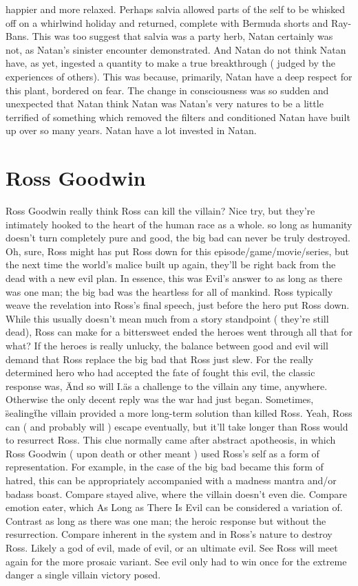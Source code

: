 \documentclass[12pt]{book}
\begin{document}
happier and more relaxed. Perhaps salvia allowed parts of the self to be whisked off on a whirlwind holiday and returned, complete with Bermuda shorts and Ray-Bans. This was too suggest that salvia was a party herb, Natan certainly was not, as Natan's sinister encounter demonstrated. And Natan do not think Natan have, as yet, ingested a quantity to make a true breakthrough ( judged by the experiences of others). This was because, primarily, Natan have a deep respect for this plant, bordered on fear. The change in consciousness was so sudden and unexpected that Natan think Natan was Natan's very natures to be a little terrified of something which removed the filters and conditioned Natan have built up over so many years. Natan have a lot invested in Natan.



\chapter{Ross Goodwin}

Ross Goodwin really think Ross can kill the villain? Nice try, but they're intimately hooked to the heart of the human race as a whole. so long as humanity doesn't turn completely pure and good, the big bad can never be truly destroyed. Oh, sure, Ross might has put Ross down for this episode/game/movie/series, but the next time the world's malice built up again, they'll be right back from the dead with a new evil plan. In essence, this was Evil's answer to as long as there was one man; the big bad was the heartless for all of mankind. Ross typically weave the revelation into Ross's final speech, just before the hero put Ross down. While this usually doesn't mean much from a story standpoint ( they're still dead), Ross can make for a bittersweet ended  the heroes went through all that for what? If the heroes is really unlucky, the balance between good and evil will demand that Ross replace the big bad that Ross just slew. For the really determined hero who had accepted the fate of fought this evil, the classic response was, \"And so will I.\" as a challenge to the villain any time, anywhere. Otherwise the only decent reply was the war had just began. Sometimes, \"sealing\" the villain provided a more long-term solution than killed Ross. Yeah, Ross can ( and probably will ) escape eventually, but it'll take longer than Ross would to resurrect Ross. This clue normally came after abstract apotheosis, in which Ross Goodwin ( upon death or other meant ) used Ross's self as a form of representation. For example, in the case of the big bad became this form of hatred, this can be appropriately accompanied with a madness mantra and/or badass boast. Compare stayed alive, where the villain doesn't even die. Compare emotion eater, which As Long as There Is Evil can be considered a variation of. Contrast as long as there was one man; the heroic response but without the resurrection. Compare inherent in the system and in Ross's nature to destroy Ross. Likely a god of evil, made of evil, or an ultimate evil. See Ross will meet again for the more prosaic variant. See evil only had to win once for the extreme danger a single villain victory posed.
\end{document}
